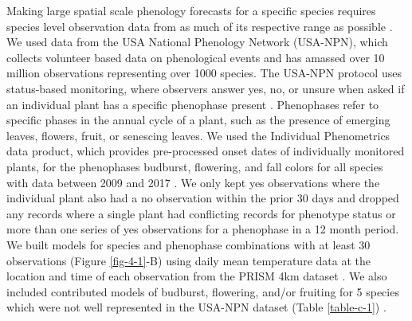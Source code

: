 Making large spatial scale phenology forecasts for a specific species requires species level observation data from as much of its respective range as possible  \citep{taylor2018b}. We used data from the USA National Phenology Network (USA-NPN), which collects volunteer based data on phenological events and has amassed over 10 million observations representing over 1000 species. The USA-NPN protocol uses status-based monitoring, where observers answer yes, no, or unsure when asked if an individual plant has a specific phenophase present \citep{denny2014}. Phenophases refer to specific phases in the annual cycle of a plant, such as the presence of emerging leaves, flowers, fruit, or senescing leaves. We used the Individual Phenometrics data product, which provides pre-processed onset dates of individually monitored plants, for the phenophases budburst, flowering, and fall colors for all species with data between 2009 and 2017 \citep{npndata2017}. We only kept yes observations where the individual plant also had a no observation within the prior 30 days and dropped any records where a single plant had conflicting records for phenotype status or more than one series of yes observations for a phenophase in a 12 month period. We built models for species and phenophase combinations with at least 30 observations (Figure \ref{fig-4-1}-B) using daily mean temperature data at the location and time of each observation from the PRISM 4km dataset \citep{prismdata}. We also included contributed models of budburst, flowering, and/or fruiting for 5 species which were not well represented in the USA-NPN dataset (Table \ref{table-c-1}) \citep{prevey2019a, biederman2018}.

